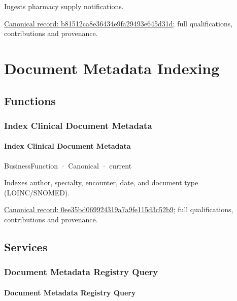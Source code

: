 Ingests pharmacy supply notifications.


{\footnotesize \href{../../../../continuum/business/business-service/b81512ca8e36434e9fa29493e645d31d.md}{Canonical record: b81512ca8e36434e9fa29493e645d31d}; full qualifications, contributions and provenance.}\par
\section{Document Metadata Indexing}

\subsection{Functions}

\subsubsection{Index Clinical Document Metadata}

\paragraph{Index Clinical Document Metadata}

\label{element:0ee35bd069924319a7a9fe115d3c52b9}
{\small BusinessFunction · Canonical · current}\par

Indexes author, specialty, encounter, date, and document type (LOINC/SNOMED).


{\footnotesize \href{../../../../continuum/business/business-function/0ee35bd069924319a7a9fe115d3c52b9.md}{Canonical record: 0ee35bd069924319a7a9fe115d3c52b9}; full qualifications, contributions and provenance.}\par
\subsection{Services}

\subsubsection{Document Metadata Registry Query}

\paragraph{Document Metadata Registry Query}

